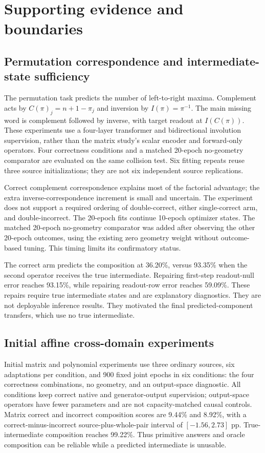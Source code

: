 \section{Supporting evidence and boundaries}
\subsection{Permutation correspondence and intermediate-state sufficiency}
The permutation task predicts the number of left-to-right maxima. Complement acts by $C(\pi)_j=n+1-\pi_j$ and inversion by $I(\pi)=\pi^{-1}$.
The main missing word is complement followed by inverse, with target readout at $I(C(\pi))$.
These experiments use a four-layer transformer and bidirectional involution supervision, rather than the matrix study's scalar encoder and forward-only operators.
Four correctness conditions and a matched 20-epoch no-geometry comparator are evaluated on the same collision test.
Six fitting repeats reuse three source initializations; they are not six independent source replications.



Correct complement correspondence explains most of the factorial advantage; the extra inverse-correspondence increment is small and uncertain. The experiment does not support a required ordering of double-correct, either single-correct arm, and double-incorrect.
The 20-epoch fits continue 10-epoch optimizer states. The matched 20-epoch no-geometry comparator was added after observing the other 20-epoch outcomes, using the existing zero geometry weight without outcome-based tuning. This timing limits its confirmatory status.

The correct arm predicts the composition at 36.20\%, versus 93.35\% when the second operator receives the true intermediate. Repairing first-step readout-null error reaches 93.15\%, while repairing readout-row error reaches 59.09\%. These repairs require true intermediate states and are explanatory diagnostics. They are not deployable inference results. They motivated the final predicted-component transfers, which use no true intermediate.

\subsection{Initial affine cross-domain experiments}
Initial matrix and polynomial experiments use three ordinary sources, six adaptations per condition, and 900 fixed joint epochs in six conditions: the four correctness combinations, no geometry, and an output-space diagnostic.
All conditions keep correct native and generator-output supervision; output-space operators have fewer parameters and are not capacity-matched causal controls.
Matrix correct and incorrect composition scores are 9.44\% and 8.92\%, with a correct-minus-incorrect source-plus-whole-pair interval of $[-1.56,2.73]$ pp. True-intermediate composition reaches 99.22\%. Thus primitive answers and oracle composition can be reliable while a predicted intermediate is unusable.

